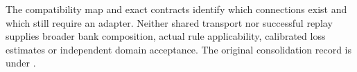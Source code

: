 The compatibility map and exact contracts identify which connections exist
and which still require an adapter. Neither shared transport nor successful
replay supplies broader bank composition, actual rule applicability, calibrated
loss estimates or independent domain acceptance. The original consolidation
record is under
.
